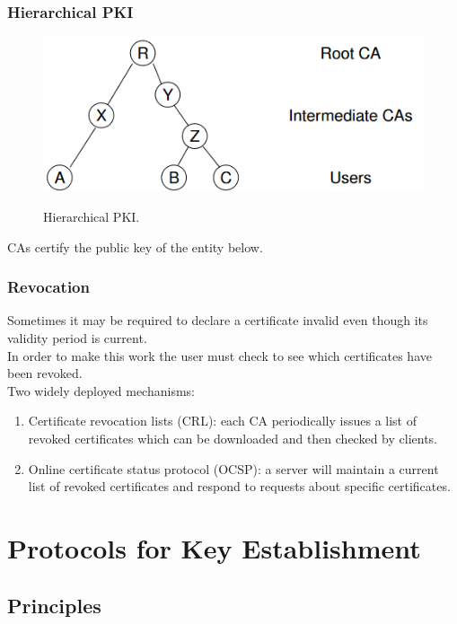\documentclass{article}
\begin{document}
\subsubsection{Hierarchical PKI}

\begin{figure}[H]
\centering
\includegraphics[scale=0.7]{Images/hierarchicalpki.png}
\label{fig:fround}
\caption{Hierarchical PKI.}
\end{figure}

CAs certify the public key of the entity below.

\subsubsection{Revocation}

Sometimes it may be required to declare a certificate invalid even though its validity period is current.\\
In order to make this work the user must check to see which certificates have been revoked.\\
Two widely deployed mechanisms:
\begin{enumerate}
    \item Certificate revocation lists (CRL): each CA periodically issues a list of revoked certificates which can be downloaded and then checked by clients.
    \item Online certificate status protocol (OCSP): a server will maintain a current list of revoked certificates and respond to requests about specific certificates.
\end{enumerate}

\newpage \section{Protocols for Key Establishment}

\subsection{Principles}
\end{document}
